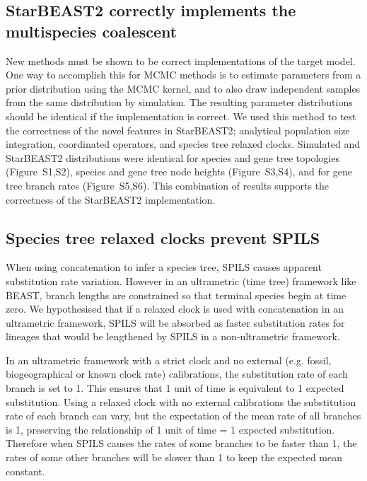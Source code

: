 \documentclass[nogrid]{MBE}%
\begin{document}
\subsection{StarBEAST2 correctly implements the multispecies coalescent}

New methods must be shown to be correct implementations of the target model.
One way to accomplish this for MCMC methods is to estimate parameters from a
prior distribution using the MCMC kernel, and to also draw independent samples
from the same distribution by simulation. The resulting parameter
distributions should be identical if the implementation is correct. We used
this method to test the correctness of the novel features in StarBEAST2;
analytical population size integration, coordinated operators, and species
tree relaxed clocks. Simulated and StarBEAST2 distributions were identical for
species and gene tree topologies (Figure~S1,S2), species and gene tree node
heights (Figure~S3,S4), and for gene tree branch rates (Figure~S5,S6). This
combination of results supports the correctness of the StarBEAST2
implementation.

\subsection{Species tree relaxed clocks prevent SPILS}

When using concatenation to infer a species tree, SPILS causes apparent
substitution rate variation. However
in an ultrametric (time tree) framework like BEAST, branch lengths are
constrained so that terminal species begin at time zero. We hypothesised that
if a relaxed clock is used with concatenation in an ultrametric framework,
SPILS will be absorbed as faster substitution rates for lineages that would be
lengthened by SPILS in a non-ultrametric framework.

In an ultrametric framework with a strict clock and no external (e.g. fossil,
biogeographical or known clock rate) calibrations, the substitution rate of
each branch is set to 1. This ensures that 1 unit of time is equivalent to 1
expected substitution. Using a relaxed clock with no external calibrations the
substitution rate of each branch can vary, but the expectation of the mean
rate of all branches is 1, preserving the relationship of 1 unit of time = 1
expected substitution. Therefore when SPILS causes the rates of some branches
to be faster than 1, the rates of some other branches will be slower than 1 to
keep the expected mean constant.
\end{document}

